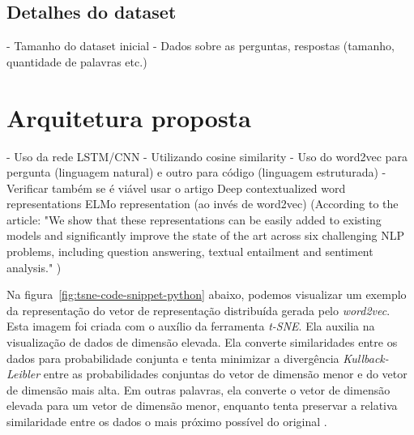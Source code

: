 \subsection{Detalhes do dataset}

 - Tamanho do dataset inicial
 - Dados sobre as perguntas, respostas (tamanho, quantidade de palavras etc.)

\section{Arquitetura proposta} 

- Uso da rede LSTM/CNN 
       - Utilizando cosine similarity
       - Uso do word2vec para pergunta (linguagem natural) e outro para código (linguagem estruturada) - Verificar também se é viável usar o artigo Deep contextualized word representations ELMo representation (ao invés de word2vec) (According to the article: "We show that
these representations can be easily added to
existing models and significantly improve the
state of the art across six challenging NLP
problems, including question answering, textual entailment and sentiment analysis." )



Na figura~\ref{fig:tsne-code-snippet-python} abaixo, podemos visualizar um exemplo da representação do vetor de representação distribuída gerada pelo \textit{word2vec}. Esta imagem foi criada com o auxílio da ferramenta \textit{t-SNE}. Ela auxilia na visualização de dados de dimensão elevada. Ela converte similaridades entre os dados para probabilidade conjunta e tenta minimizar a divergência \emph{Kullback-Leibler} entre as probabilidades conjuntas do vetor de dimensão menor e do vetor de dimensão mais alta. Em outras palavras, ela converte o vetor de dimensão elevada para um vetor de dimensão menor, enquanto tenta preservar a relativa similaridade entre os dados o mais próximo possível do original \citep{scikit-learn-tsne-2019, quora-tsne-2019}.




